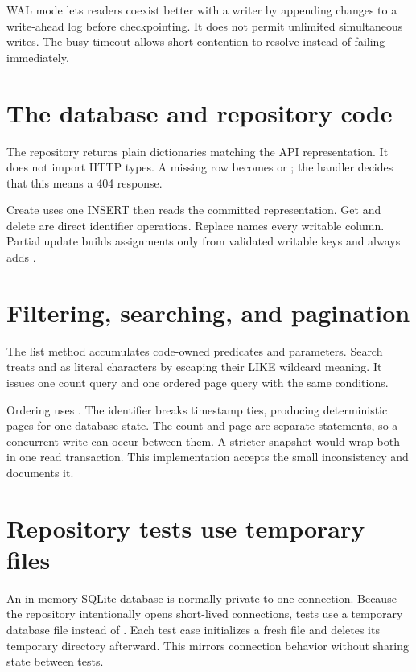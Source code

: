WAL mode lets readers coexist better with a writer by appending changes to a
write-ahead log before checkpointing. It does not permit unlimited simultaneous
writes. The busy timeout allows short contention to resolve instead of failing
immediately.

\section{The database and repository code}


The repository returns plain dictionaries matching the API representation. It
does not import HTTP types. A missing row becomes  or ;
the handler decides that this means a 404 response.

Create uses one INSERT then reads the committed representation. Get and delete
are direct identifier operations. Replace names every writable column. Partial
update builds assignments only from validated writable keys and always adds
.

\section{Filtering, searching, and pagination}

The list method accumulates code-owned predicates and parameters. Search treats
\code{\%} and \code{\_} as literal characters by escaping their LIKE wildcard
meaning. It issues one count query and one ordered page query with the same
conditions.

Ordering uses . The identifier breaks timestamp
ties, producing deterministic pages for one database state. The count and page
are separate statements, so a concurrent write can occur between them. A stricter
snapshot would wrap both in one read transaction. This implementation accepts
the small inconsistency and documents it.

\section{Repository tests use temporary files}

An in-memory SQLite database is normally private to one connection. Because the
repository intentionally opens short-lived connections, tests use a temporary
database file instead of . Each test case initializes a fresh file
and deletes its temporary directory afterward. This mirrors connection behavior
without sharing state between tests.

